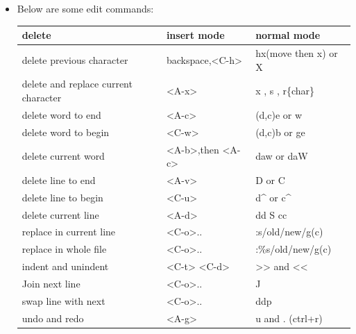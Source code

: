 \documentclass[a4paper,11pt,twoside]{book}
\begin{document}
\begin{itemize}
			
\item Below are some edit commands:

\begin{center}
		\begin{tabular}{p{}|p{}|p{}}
		\hline
		delete & insert mode & normal mode\\

   	    \hline 
		delete previous character & backspace,<C-h> & hx(move then x) or X  \\
	
		\hline 
		delete and replace current character & <A-x> & x , s , r\{char\}  \\
	
		\hline 
		delete word to end & <A-c> & (d,c)e or w  \\
		
		\hline 
		delete word to begin & <C-w> &(d,c)b or ge  \\

		\hline 
		delete current word &<A-b>,then <A-c> & daw or daW \\
		
		\hline 
		delete line to end & <A-v> & D or C  \\
		
		\hline 
		delete line to begin & <C-u> & d\^{} or c\^{}  \\
		
		\hline 
		delete current line & <A-d> & dd S cc \\

       \hline
	   replace in current line &<C-o>.. & :s/old/new/g(c) \\

		\hline 
	   replace in whole file &<C-o>.. & :\%s/old/new/g(c) \\

	   \hline
		indent and unindent & <C-t> <C-d> & >> and << \\

	   \hline 
	   Join next line & <C-o>.. & J \\ 

	   \hline 
		swap line with next &<C-o>.. & ddp \\
	
		\hline 
		undo and redo & <A-g> &  u and . (ctrl+r) \\ 
		
				\end{tabular}
	\end{center}


\end{itemize}
\end{document}
